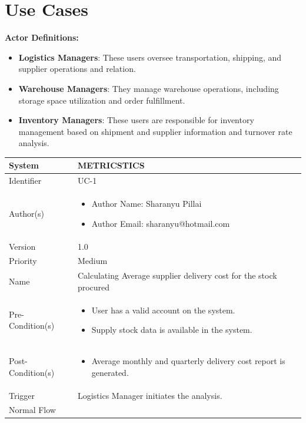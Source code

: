 \section{Use Cases}
\textbf{Actor Definitions:}
\begin{itemize}
	\item \textbf{Logistics Managers}: These users oversee transportation, shipping, and supplier operations and relation.
	\item \textbf{Warehouse Managers}: They manage warehouse operations, including storage space utilization and order fulfillment.
	\item \textbf{Inventory Managers}: These users are responsible for inventory management based on shipment and supplier information and turnover rate analysis.
\end{itemize}
\begin{center}
	\begin{tabularx}{\textwidth}{|l|X|}
		\hline
		System & METRICSTICS \\
		\hline
		Identifier & UC-1 \\
		\hline
		Author(s) & \begin{itemize}[left=0pt]
			\item Author Name: Sharanyu Pillai
			\item Author Email: sharanyu@hotmail.com
		\end{itemize} \\
		\hline
		Version & 1.0 \\
		\hline
		Priority & Medium \\
		\hline
		Name & Calculating Average supplier delivery cost for the stock procured \\
		\hline
		Pre-Condition(s) &  \begin{itemize}[left=0pt]
			\item User has a valid account on the system.
			\item Supply stock data is available in the system.
		\end{itemize} \\
		\hline
		Post-Condition(s) & \begin{itemize}[left=0pt]
			\item Average monthly and quarterly delivery cost report is generated.
		\end{itemize} \\
		\hline
		Trigger & Logistics Manager initiates the analysis. \\
		\hline
		Normal Flow & \begin{enumerate}[left=0pt]

\end{enumerate}
\end{tabularx}
\end{center}
